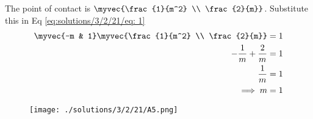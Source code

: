 The point of contact is $\myvec{\frac{1}{m^2} \\ \frac{2}{m}}$. Substitute this in Eq \eqref{eq:solutions/3/2/21/eq: 1}
\begin{align}
    \myvec{-m & 1}\myvec{\frac{1}{m^2} \\ \frac{2}{m}} = 1\\
    -\frac{1}{m} + \frac{2}{m} = 1\\
    \frac{1}{m} = 1\\
    \implies m = 1
\end{align}
\begin{figure}[!ht]
\centering
\texttt{[image: ./solutions/3/2/21/A5.png]}
\caption{}
\label{eq:solutions/3/2/21/Fig:1}
\end{figure}
